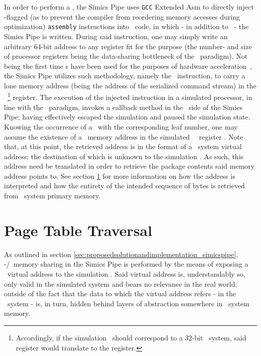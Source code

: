 In order to perform a \dvttermmagicinstruction , the Simics Pipe uses \texttt{GCC} Extended Asm to directly inject -flagged (as to prevent the compiler from reordering memory accesses during optimization) \texttt{assembly} instructions into \dvttermc\ code, in which - in addition to \dvttermcplusplus\ - the Simics Pipe is written.
During said instruction, one may simply write an arbitrary 64-bit address to any register fit for the purpose (the number- and size of processor registers being the data-sharing bottleneck of the \dvttermmagicinstruction\ paradigm).
Not being the first time \dvttermmagicinstruction s have been used for the purposes of hardware acceleration~, the Simics Pipe utilizes such methodology, namely the  \dvttermxeightysix\ instruction, to carry a lone memory address (being the address of the serialized command stream) in the \dvttermtarget\ \footnote{Accordingly, if the simulation \dvttermtarget\ should correspond to a 32-bit \dvttermxeightysix\ system, said register would translate to the  register.} register.
The execution of the injected instruction in a simulated processor, in line with the \dvttermmagicinstruction\ paradigm, invokes a callback method in the \dvttermhost\ side of the Simics Pipe; having effectively escaped the simulation and paused the simulation state.
Knowing the occurrence of a \dvttermmagicinstruction\ with the corresponding leaf number, one may assume the existence of a \dvttermtarget\ memory address in the simulated \dvttermtarget\ \dvttermcpu\ register .
Note that, at this point, the retrieved address is in the format of a \dvttermtarget\ system virtual address; the destination of which is unknown to the simulation \dvttermhost .
As such, this address need be translated in order to retrieve the package contents said memory address points to.
See section \ref{sec:proposedsolutionandimplementation_pagetabletraversal} for more information on how the address is interpreted and how the entirety of the intended sequence of bytes is retrieved from \dvttermtarget\ system primary memory.



\section{Page Table Traversal}
\label{sec:proposedsolutionandimplementation_pagetabletraversal}
As outlined in section \ref{sec:proposedsolutionandimplementation_simicspipe}, \dvttermtarget -/\dvttermhost\ memory sharing in the Simics Pipe is performed by the means of exposing a \dvttermtarget\ virtual address to the simulation \dvttermhost .
Said virtual address is, understandably so, only valid in the simulated system and bears no relevance in the real world; outside of the fact that the data to which the virtual address refers - in the \dvttermtarget\ system - is, in turn, hidden behind layers of abstraction somewhere in \dvttermhost\ system memory.

